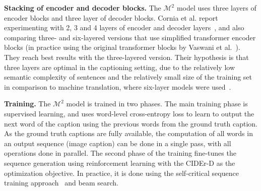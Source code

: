 \documentclass[english,twoside,openright]{HYgraduMLDS}
\begin{document}
\textbf{Stacking of encoder and decoder blocks.} The $\mathcal{M}^2$ model uses three layers of encoder blocks and three layer of decoder blocks. Cornia et al. report experimenting with 2, 3 and 4 layers of encoder and decoder layers~\cite{M2supplement}, and also comparing three- and six-layered versions that use simplified transformer encoder blocks (in practice using the original transformer blocks by Vaswani et al.~\cite{Attention}). They reach best results with the three-layered version. Their hypothesis is that three layers are optimal in the captioning setting, due to the relatively low semantic complexity of sentences and the relatively small size of the training set in comparison to machine translation, where six-layer models were used~\cite{M2}.   

\textbf{Training.} The $\mathcal{M}^2$ model is trained in two phases. The main training phase is supervised learning, and uses word-level cross-entropy loss to learn to output the next word of the caption using the previous words from the ground truth caption. As the ground truth captions are fully available, the computation of all words in an output sequence (image caption) can be done in a single pass, with all operations done in parallel. The second phase of the training fine-tunes the sequence generation using reinforcement learning with the CIDEr-D as the optimization objective. In practice, it is done using the self-critical sequence training approach~\cite{SelfCriticalTraining} and beam search.
\end{document}
